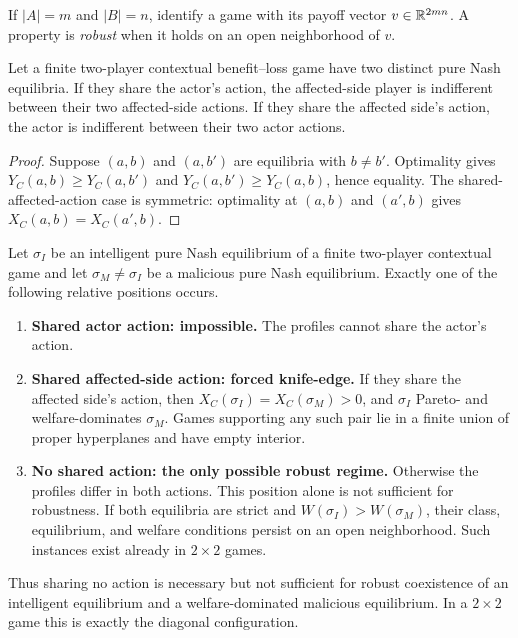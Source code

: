 If $|A|=m$ and $|B|=n$, identify a game with its payoff vector $v\in\mathbb{R}^{2mn}$. A property is \emph{robust} when it holds on an open neighborhood of $v$.

\begin{lemma}
\label{lem:coexist}
Let a finite two-player contextual benefit--loss game have two distinct pure Nash equilibria. If they share the actor's action, the affected-side player is indifferent between their two affected-side actions. If they share the affected side's action, the actor is indifferent between their two actor actions.
\end{lemma}

\begin{proof}
Suppose $(a,b)$ and $(a,b')$ are equilibria with $b\ne b'$. Optimality gives $Y_C(a,b)\ge Y_C(a,b')$ and $Y_C(a,b')\ge Y_C(a,b)$, hence equality. The shared-affected-action case is symmetric: optimality at $(a,b)$ and $(a',b)$ gives $X_C(a,b)=X_C(a',b)$.
\end{proof}

\begin{theorem}
\label{thm:configuration}
Let $\sigma_I$ be an intelligent pure Nash equilibrium of a finite two-player contextual game and let $\sigma_M\ne\sigma_I$ be a malicious pure Nash equilibrium. Exactly one of the following relative positions occurs.
\begin{enumerate}[label=(\alph*)]
\item \textbf{Shared actor action: impossible.} The profiles cannot share the actor's action.
\item \textbf{Shared affected-side action: forced knife-edge.} If they share the affected side's action, then $X_C(\sigma_I)=X_C(\sigma_M)>0$, and $\sigma_I$ Pareto- and welfare-dominates $\sigma_M$. Games supporting any such pair lie in a finite union of proper hyperplanes and have empty interior.
\item \textbf{No shared action: the only possible robust regime.} Otherwise the profiles differ in both actions. This position alone is not sufficient for robustness. If both equilibria are strict and $W(\sigma_I)>W(\sigma_M)$, their class, equilibrium, and welfare conditions persist on an open neighborhood. Such instances exist already in $2\times2$ games.
\end{enumerate}
Thus sharing no action is necessary but not sufficient for robust coexistence of an intelligent equilibrium and a welfare-dominated malicious equilibrium. In a $2\times2$ game this is exactly the diagonal configuration.
\end{theorem}

